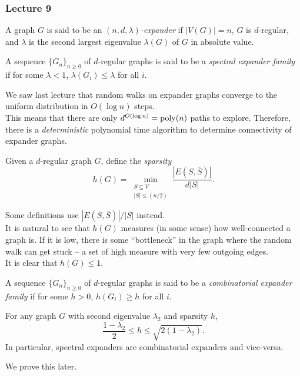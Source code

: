 		\subsubsection{Lecture 9}

			\begin{fdef}
				A graph $G$ is said to be an \emph{$(n,d,\lambda)$-expander} if $|V(G)| = n$, $G$ is $d$-regular, and $\lambda$ is the second largest eigenvalue $\lambda(G)$ of $G$ in absolute value.
			\end{fdef}

			\begin{fdef}
				A sequence $\{G_n\}_{n \ge 0}$ of $d$-regular graphs %
				is said to be a \emph{spectral expander family} if for some $\lambda < 1$, $\lambda(G_i) \le \lambda$ for all $i$.
			\end{fdef}

			We saw last lecture that random walks on expander graphs converge to the uniform distribution in $O(\log n)$ steps.\\
			This means that there are only $d^{O(\log n)} = \operatorname{poly}(n)$ paths to explore. Therefore, there is a \emph{deterministic} polynomial time algorithm to determine connectivity of expander graphs.

			\begin{fdef}[Sparsity]
				Given a $d$-regular graph $G$, define the \emph{sparsity}
				\[ h(G) = \min_{\substack{S \subseteq V \\ |S| \le (n/2)}} \frac{|E(S,\overline{S})|}{d|S|}. \]
			\end{fdef}
			Some definitions use $|E(S,\overline{S})|/|S|$ instead.\\
			It is natural to see that $h(G)$ measures (in some sense) how well-connected a graph is. If it is low, there is some ``bottleneck'' in the graph where the random walk can get stuck -- a set of high measure with very few outgoing edges.\\
			It is clear that $h(G) \le 1$.

			\begin{fdef}
				A sequence $\{G_n\}_{n \ge 0}$ of $d$-regular graphs %
				is said to be a \emph{combinatorial expander family} if for some $h > 0$, $h(G_i) \ge h$ for all $i$.
			\end{fdef}

			\begin{ftheo}
				\label{cheeger inequality}
				For any graph $G$ with second eigenvalue $\lambda_2$ and sparsity $h$,
				\[ \frac{1-\lambda_2}{2} \le h \le \sqrt{2(1-\lambda_2)}. \]
				In particular, spectral expanders are combinatorial expanders and vice-versa.
			\end{ftheo}
			We prove this later.\\

